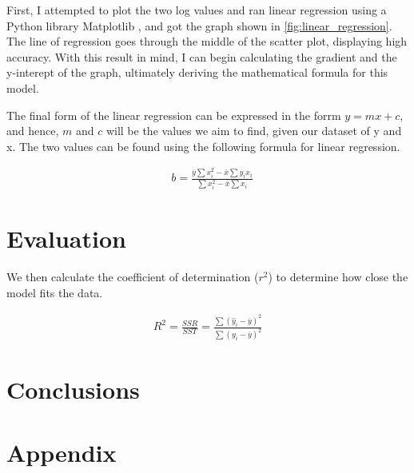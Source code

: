 \documentclass[11pt]{article}
\begin{document}
First, I attempted to plot the two log values and ran linear regression using a Python library Matplotlib \cite{Hunter:2007}, and got the graph shown in \ref{fig:linear_regression}. The line of regression goes through the middle of the scatter plot, displaying high accuracy. With this result in mind, I can begin calculating the gradient and the y-interept of the graph, ultimately deriving the mathematical formula for this model.

The final form of the linear regression can be expressed in the forrm $y=mx+c$, and hence, $m$ and $c$ will be the values we aim to find, given our dataset of y and x. The two values can be found using the following formula for linear regression. 

\begin{align}
&b = \frac { \overline { y } \sum x _ { i } ^ { 2 } - \overline { x } \sum y _ { i } x _ { i } } { \sum x _ { i } ^ { 2 } - \overline { x } \sum x _ { i } }
\end{align}


\section{Evaluation}\label{section-experiments}
We then calculate the coefficient of determination ($r^ {2}$) to determine how close the model fits the data. 

\begin{align}
R ^ { 2 } = \frac { S S R } { S S T } = \frac { \sum \left( \hat { y } _ { i } - \overline { y } \right) ^ { 2 } } { \sum \left( y _ { i } - \overline { y } \right) ^ { 2 } }
\end{align}



\section{Conclusions}\label{section-conclusions}

\section{Appendix}\label{section-appendix}





\end{document}
